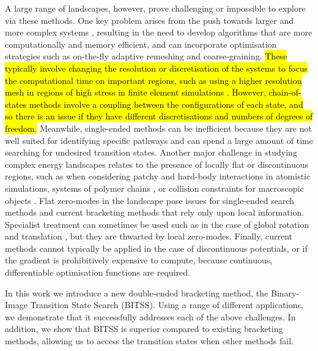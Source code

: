 \documentclass[aip,jcp,reprint,twocolumn]{revtex4-1}
\begin{document}
A large range of landscapes, however, prove challenging or impossible to explore via these methods.
One key problem arises from the push towards larger and more complex systems \cite{Trefethen2013,Shalf2020,Alexander2020}, resulting in the need to develop algorithms that are more computationally and memory efficient, and can incorporate optimisation strategies such as on-the-fly adaptive remeshing and coarse-graining.
\hl{These typically involve changing the resolution or discretisation of the systems to focus the computational time on important regions, such as using a higher resolution mesh in regions of high stress in finite element simulations {\cite{Lee1994}}.
However, chain-of-states methods involve a coupling between the configurations of each state, and so there is an issue if they have different discretisations and numbers of degrees of freedom.}
Meanwhile, single-ended methods can be inefficient because they are not well suited for identifying specific pathways and can spend a large amount of time searching for undesired transition states.
Another major challenge in studying complex energy landscapes relates to the presence of locally flat or discontinuous regions, such as when considering patchy \cite{McMullen2018,Nguemaha2018,Chen2018b} and hard-body \cite{Richard2018,Santra2018} interactions in atomistic simulations, systems of polymer chains \cite{Mokkonen2016}, or collision constraints for macroscopic objects \cite{Wriggers2006}.
Flat zero-modes in the landscape pose issues for single-ended search methods and current bracketing methods that rely only upon local information.
Specialist treatment can sometimes be used such as in the case of global rotation and translation \cite{Page1988}, but they are thwarted by local zero-modes.
Finally, current methods cannot typically be applied in the case of discontinuous potentials, or if the gradient is prohibitively expensive to compute, because continuous, differentiable optimisation functions are required.

In this work we introduce a new double-ended bracketing method, the Binary-Image Transition State Search (BITSS).
Using a range of different applications, we demonstrate that it successfully addresses each of the above challenges.
In addition, we show that BITSS is superior compared to existing bracketing methods, allowing us to access the transition states when other methods fail.
\end{document}
